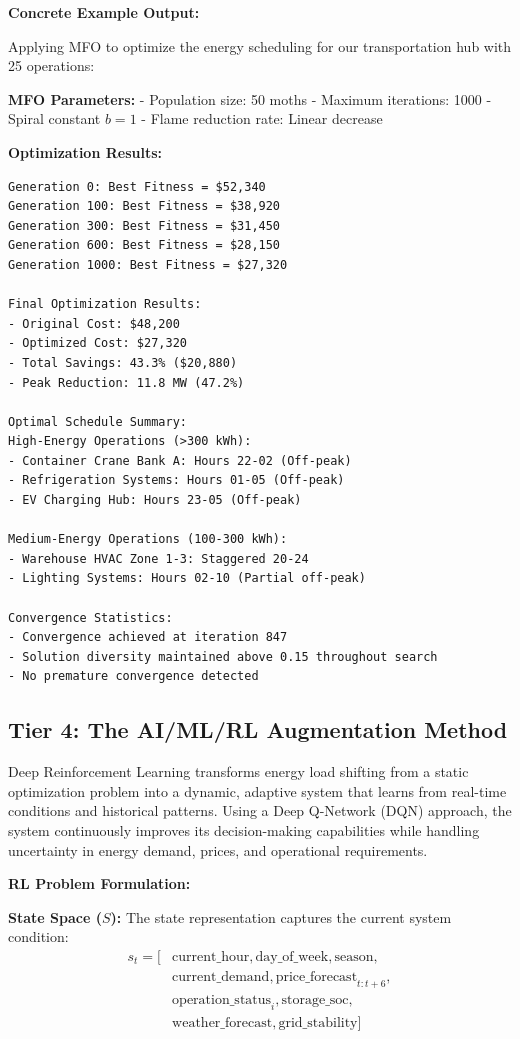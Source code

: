\documentclass{article}
\begin{document}
\textbf{Concrete Example Output:}

Applying MFO to optimize the energy scheduling for our transportation hub with 25 operations:

\textbf{MFO Parameters:}
- Population size: 50 moths
- Maximum iterations: 1000
- Spiral constant $b = 1$
- Flame reduction rate: Linear decrease

\textbf{Optimization Results:}
\begin{verbatim}
Generation 0: Best Fitness = $52,340
Generation 100: Best Fitness = $38,920
Generation 300: Best Fitness = $31,450
Generation 600: Best Fitness = $28,150
Generation 1000: Best Fitness = $27,320

Final Optimization Results:
- Original Cost: $48,200
- Optimized Cost: $27,320
- Total Savings: 43.3% ($20,880)
- Peak Reduction: 11.8 MW (47.2%)

Optimal Schedule Summary:
High-Energy Operations (>300 kWh):
- Container Crane Bank A: Hours 22-02 (Off-peak)
- Refrigeration Systems: Hours 01-05 (Off-peak)
- EV Charging Hub: Hours 23-05 (Off-peak)

Medium-Energy Operations (100-300 kWh):
- Warehouse HVAC Zone 1-3: Staggered 20-24
- Lighting Systems: Hours 02-10 (Partial off-peak)

Convergence Statistics:
- Convergence achieved at iteration 847
- Solution diversity maintained above 0.15 throughout search
- No premature convergence detected
\end{verbatim}

\subsection{Tier 4: The AI/ML/RL Augmentation Method}

Deep Reinforcement Learning transforms energy load shifting from a static optimization problem into a dynamic, adaptive system that learns from real-time conditions and historical patterns. Using a Deep Q-Network (DQN) approach, the system continuously improves its decision-making capabilities while handling uncertainty in energy demand, prices, and operational requirements.

\textbf{RL Problem Formulation:}

\textbf{State Space ($S$):}
The state representation captures the current system condition:
\begin{align}
s_t = [&\text{current\_hour}, \text{day\_of\_week}, \text{season}, \\
&\text{current\_demand}, \text{price\_forecast}_{t:t+6}, \\
&\text{operation\_status}_i, \text{storage\_soc}, \\
&\text{weather\_forecast}, \text{grid\_stability}]
\end{align}
\end{document}

